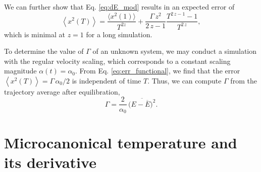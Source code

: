\documentclass[reprint]{revtex4-1}
\begin{document}
We can further show that Eq. \eqref{eq:dE_mod}
results in an expected error of
\begin{equation}
  \left\langle
  x^2(T)
  \right\rangle
  =
  \frac{ \langle x^2(1) \rangle } { T^{2z} }
  +
  \frac{ \Gamma \, z^2 } { 2 \, z - 1 }
  \frac{
    T^{2 \, z - 1} - 1
  }
  {
    T^{2 \, z}
  }
  ,
  \label{eq:err_zovert}
\end{equation}
which is minimal at $z = 1$ for a long simulation.

To determine the value of $\Gamma$ of an unknown system,
we may conduct a simulation with the regular velocity scaling,
which corresponds to a constant scaling magnitude
$\alpha(t) = \alpha_0$.
%
From Eq. \eqref{eq:err_functional}, we find that
the error
$\left\langle
  x^2(T)
\right\rangle
=
\Gamma \, \alpha_0 / 2$
is independent of time $T$.
Thus, we can compute $\Gamma$ from the trajectory average
after equilibration,
\begin{equation}
\Gamma
=
\frac{ 2 } { \alpha_0 } \,
\overline{
  \bigl(
    E - \overline E
  \bigr)^2
}
.
\label{eq:Gamma_alpha0}
\end{equation}


\section{Microcanonical temperature and its derivative}
\end{document}
